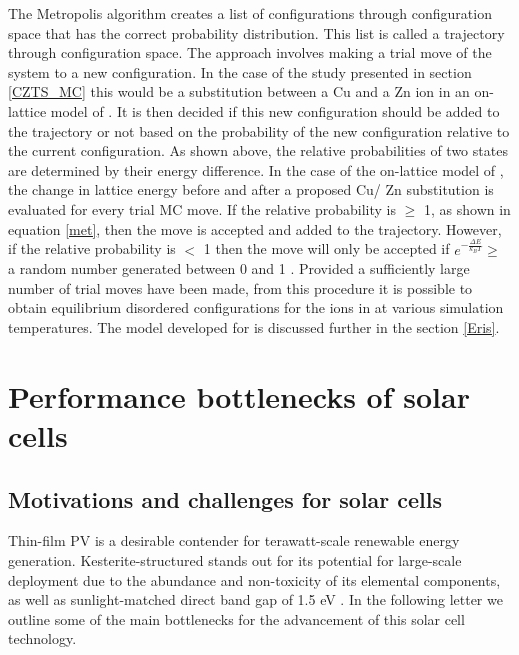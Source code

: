 \documentclass[11pt, twoside]{report}
\begin{document}
The Metropolis algorithm creates a list of configurations through configuration space that has the correct probability distribution. This list is called a trajectory through configuration space. The approach involves making a trial move of the system to a new configuration. In the case of the study presented in section \ref{CZTS_MC} this would be a substitution between a Cu and a Zn ion in an on-lattice model of {\CZTS}. It is then decided if this new configuration should be added to the trajectory or not based on the probability of the new configuration relative to the current configuration. As shown above, the relative probabilities of two states are determined by their energy difference. In the case of the on-lattice model of {\CZTS}, the change in lattice energy before and after a proposed Cu/ Zn substitution is evaluated for every trial MC move. If the relative probability is  $\geq$ 1, as shown in equation \ref{met}, then the move is accepted and added to the trajectory. However, if the relative probability is $<$ 1 then the move will only be accepted if $e^{-\frac{\Delta E}{k_BT}} \ge$ a random number generated between 0 and 1 \cite{Lesar3}. Provided a sufficiently large number of trial moves have been made, from this procedure it is possible to obtain equilibrium disordered configurations for the ions in {\CZTS} at various simulation temperatures. The model developed for {\CZTS} is discussed further in the section \ref{Eris}.


 








\chapter{Performance bottlenecks of {\CZTS} solar cells}\label{chap:CZTS}
\section{Motivations and challenges for {\CZTS} solar cells}
Thin-film PV is a desirable contender for terawatt-scale renewable energy generation. Kesterite-structured {\CZTS} stands out for its potential for large-scale deployment due to the abundance and non-toxicity of its elemental components, as well as sunlight-matched direct band gap of 1.5 eV \cite{CZTS_rev}. In the following letter we outline some of the main bottlenecks for the advancement of this solar cell technology.
\end{document}
